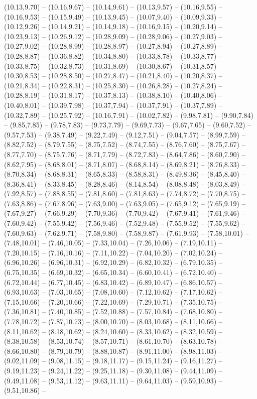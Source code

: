 \expandafter\def\csname geo:gebiet:DE-BB\endcsname{
  (10.13,9.70) -- (10.16,9.67) -- (10.14,9.61) -- (10.13,9.57) -- (10.16,9.55) -- (10.16,9.53) -- (10.15,9.49) -- (10.13,9.45) -- (10.07,9.40) -- (10.09,9.33) -- (10.12,9.26) -- (10.14,9.21) -- (10.14,9.18) -- (10.16,9.15) -- (10.20,9.14) -- (10.23,9.13) -- (10.26,9.12) -- (10.28,9.09) -- (10.28,9.06) -- (10.27,9.03) -- (10.27,9.02) -- (10.28,8.99) -- (10.28,8.97) -- (10.27,8.94) -- (10.27,8.89) -- (10.28,8.87) -- (10.36,8.82) -- (10.34,8.80) -- (10.33,8.78) -- (10.33,8.77) -- (10.33,8.75) -- (10.32,8.73) -- (10.31,8.69) -- (10.30,8.67) -- (10.31,8.57) -- (10.30,8.53) -- (10.28,8.50) -- (10.27,8.47) -- (10.21,8.40) -- (10.20,8.37) -- (10.21,8.34) -- (10.22,8.31) -- (10.25,8.30) -- (10.26,8.28) -- (10.27,8.24) -- (10.28,8.19) -- (10.31,8.17) -- (10.37,8.13) -- (10.38,8.10) -- (10.40,8.06) -- (10.40,8.01) -- (10.39,7.98) -- (10.37,7.94) -- (10.37,7.91) -- (10.37,7.89) -- (10.32,7.89) -- (10.25,7.92) -- (10.16,7.91) -- (10.02,7.82) -- (9.98,7.81) -- (9.90,7.84) -- (9.85,7.85) -- (9.78,7.83) -- (9.73,7.79) -- (9.69,7.73) -- (9.67,7.65) -- (9.60,7.52) -- (9.57,7.53) -- (9.38,7.49) -- (9.22,7.49) -- (9.12,7.51) -- (9.04,7.57) -- (8.99,7.59) -- (8.82,7.52) -- (8.79,7.55) -- (8.75,7.52) -- (8.74,7.55) -- (8.76,7.60) -- (8.75,7.67) -- (8.77,7.70) -- (8.75,7.76) -- (8.71,7.79) -- (8.72,7.83) -- (8.64,7.86) -- (8.60,7.90) -- (8.62,7.95) -- (8.68,8.01) -- (8.71,8.07) -- (8.68,8.14) -- (8.69,8.21) -- (8.76,8.33) -- (8.70,8.34) -- (8.68,8.31) -- (8.65,8.33) -- (8.58,8.31) -- (8.49,8.36) -- (8.45,8.40) -- (8.36,8.41) -- (8.33,8.45) -- (8.28,8.46) -- (8.14,8.54) -- (8.08,8.48) -- (8.03,8.49) -- (7.92,8.57) -- (7.88,8.55) -- (7.81,8.60) -- (7.81,8.63) -- (7.74,8.72) -- (7.70,8.75) -- (7.63,8.86) -- (7.67,8.96) -- (7.63,9.00) -- (7.63,9.05) -- (7.65,9.12) -- (7.65,9.19) -- (7.67,9.27) -- (7.66,9.29) -- (7.70,9.36) -- (7.70,9.42) -- (7.67,9.41) -- (7.61,9.46) -- (7.60,9.42) -- (7.55,9.42) -- (7.56,9.46) -- (7.52,9.48) -- (7.55,9.52) -- (7.55,9.62) -- (7.60,9.63) -- (7.62,9.71) -- (7.58,9.80) -- (7.58,9.87) -- (7.61,9.93) -- (7.58,10.01) -- (7.48,10.01) -- (7.46,10.05) -- (7.33,10.04) -- (7.26,10.06) -- (7.19,10.11) -- (7.20,10.15) -- (7.16,10.16) -- (7.11,10.22) -- (7.04,10.20) -- (7.02,10.24) -- (6.96,10.26) -- (6.96,10.31) -- (6.92,10.29) -- (6.82,10.32) -- (6.79,10.35) -- (6.75,10.35) -- (6.69,10.32) -- (6.65,10.34) -- (6.60,10.41) -- (6.72,10.40) -- (6.72,10.44) -- (6.77,10.45) -- (6.83,10.42) -- (6.89,10.47) -- (6.86,10.57) -- (6.93,10.63) -- (7.03,10.65) -- (7.08,10.60) -- (7.12,10.62) -- (7.17,10.62) -- (7.15,10.66) -- (7.20,10.66) -- (7.22,10.69) -- (7.29,10.71) -- (7.35,10.75) -- (7.36,10.81) -- (7.40,10.85) -- (7.52,10.88) -- (7.57,10.84) -- (7.68,10.80) -- (7.78,10.72) -- (7.87,10.73) -- (8.00,10.70) -- (8.03,10.68) -- (8.11,10.66) -- (8.11,10.62) -- (8.18,10.62) -- (8.24,10.60) -- (8.33,10.62) -- (8.32,10.59) -- (8.38,10.58) -- (8.53,10.74) -- (8.57,10.71) -- (8.61,10.70) -- (8.63,10.78) -- (8.66,10.80) -- (8.79,10.79) -- (8.88,10.87) -- (8.91,11.00) -- (8.98,11.03) -- (9.02,11.09) -- (9.08,11.15) -- (9.18,11.17) -- (9.15,11.24) -- (9.16,11.27) -- (9.19,11.23) -- (9.24,11.22) -- (9.25,11.18) -- (9.30,11.08) -- (9.44,11.09) -- (9.49,11.08) -- (9.53,11.12) -- (9.63,11.11) -- (9.64,11.03) -- (9.59,10.93) -- (9.51,10.86) -- }
